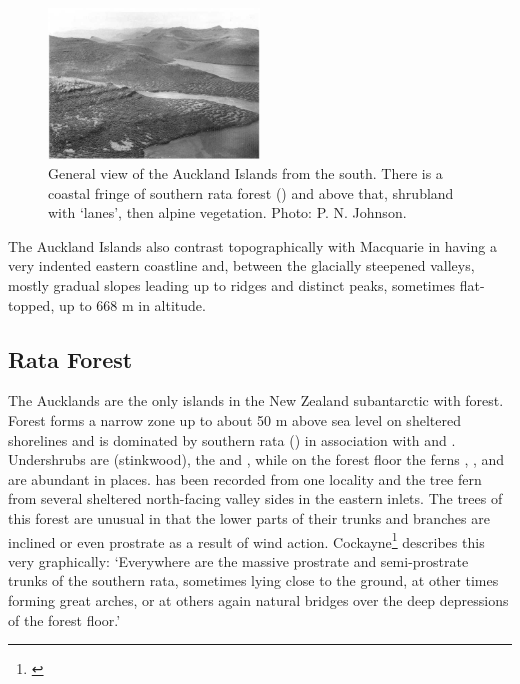 \begin{figure}
	\includegraphics[width=0.5\textwidth]{graphics/figure116auckland-islands.jpg}
	\centering
	\caption[General view of the Auckland Islands from the south]{General view of the Auckland Islands from the south.
    There is a coastal fringe of southern rata forest () and above that, shrubland with `lanes', then alpine vegetation.
	Photo: P. N. Johnson.}
	\label{fig:116auckland-islands}
\end{figure}

The Auckland Islands also contrast topographically with Macquarie in having a very indented eastern coastline and, between the glacially steepened valleys, mostly gradual slopes leading up to ridges and distinct peaks, sometimes flat-topped, up to 668 m in altitude.

\subsection{Rata Forest}

The Aucklands are the only islands in the New Zealand subantarctic with forest.
Forest forms a narrow zone up to about 50 m above sea level on sheltered shorelines and is dominated by southern rata () in association with  and .
Undershrubs are  (stinkwood), the  and , while on the forest floor the ferns , , and  are abundant in places.  has been recorded from one locality and the tree fern  from several sheltered north-facing valley sides in the eastern inlets.
The trees of this forest are unusual in that the lower parts of their trunks and branches are inclined or even prostrate as a result of wind action.
Cockayne\footnote{\cite{cockayne1909ecological}} describes this very graphically: `Everywhere are the massive prostrate and semi-prostrate trunks of the southern rata, sometimes lying close to the ground, at other times forming great arches, or at others again natural bridges over the deep depressions of the forest floor.'

